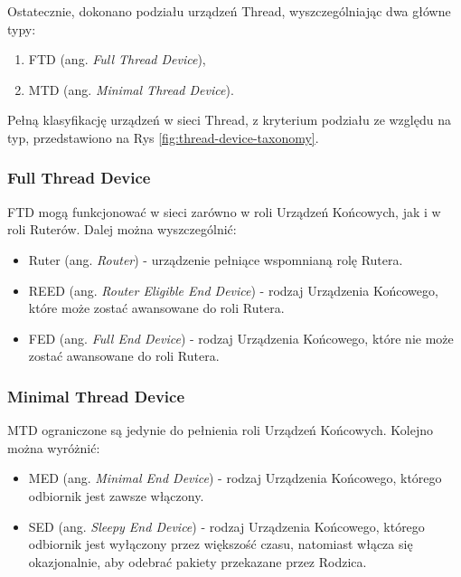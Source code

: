         Ostatecznie, dokonano podziału urządzeń Thread, wyszczególniając dwa główne typy:
        \begin{enumerate}
            \item FTD (ang. \textit{Full Thread Device}),
            \item MTD (ang. \textit{Minimal Thread Device}).
        \end{enumerate}

        Pełną klasyfikację urządzeń w sieci Thread, z kryterium podziału ze względu na typ, przedstawiono na Rys \ref{fig:thread-device-taxonomy}.

        \subsubsection{Full Thread Device}

            FTD mogą funkcjonować w sieci zarówno w roli Urządzeń Końcowych, jak i w roli Ruterów. Dalej można wyszczególnić: 
            \begin{itemize}
                \item Ruter (ang. \textit{Router}) - urządzenie pełniące wspomnianą rolę Rutera.
                \item REED (ang. \textit{Router Eligible End Device}) - rodzaj Urządzenia Końcowego, które może zostać awansowane do roli Rutera.
                \item FED (ang. \textit{Full End Device}) - rodzaj Urządzenia Końcowego, które nie może zostać awansowane do roli Rutera.
            \end{itemize}
        
        \subsubsection{Minimal Thread Device}

            MTD ograniczone są jedynie do pełnienia roli Urządzeń Końcowych. Kolejno można wyróżnić:
            \begin{itemize}
                \item MED (ang. \textit{Minimal End Device}) - rodzaj Urządzenia Końcowego, którego odbiornik jest zawsze włączony.
                \item SED (ang. \textit{Sleepy End Device}) - rodzaj Urządzenia Końcowego, którego odbiornik jest wyłączony przez większość czasu, natomiast włącza się okazjonalnie, aby odebrać pakiety przekazane przez Rodzica.
            \end{itemize}

